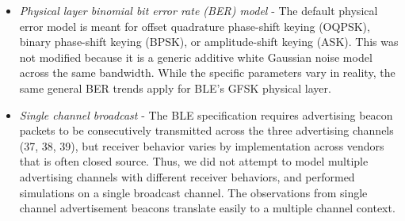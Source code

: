 \begin{itemize}

\item \textit{Physical layer binomial bit error rate (BER) model} - The default
physical error model is meant for offset quadrature phase-shift keying (OQPSK),
binary phase-shift keying (BPSK), or amplitude-shift keying (ASK). This was not
modified because it is a generic additive white Gaussian noise model across the
same bandwidth. While the specific parameters vary in reality, the same general
BER trends apply for BLE’s GFSK physical layer. 

\item \textit{Single channel broadcast} - The BLE specification requires
advertising beacon packets to  be consecutively transmitted across the three
advertising channels (37, 38, 39), but receiver behavior varies by
implementation across vendors that is often closed source. Thus, we did not
attempt to model multiple advertising channels with different receiver
behaviors, and performed simulations on a single broadcast channel. The
observations from single channel advertisement beacons translate easily to a
multiple channel context. 

\end{itemize}

